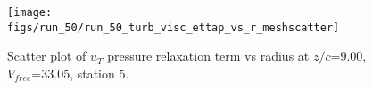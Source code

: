 \begin{figure}[H]
\centering
\texttt{[image: figs/run\_50/run\_50\_turb\_visc\_ettap\_vs\_r\_meshscatter]}
\caption{Scatter plot of $
u_T$ pressure relaxation term vs radius at $z/c$=9.00, $V_{free}$=33.05, station 5.}
\end{figure}


